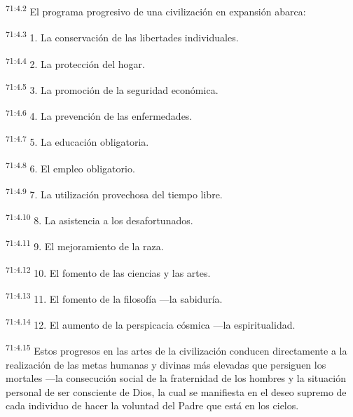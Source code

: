 \par
\textsuperscript{71:4.2} El programa progresivo de una civilización en expansión abarca:

\par
\textsuperscript{71:4.3} 1. La conservación de las libertades individuales.

\par
\textsuperscript{71:4.4} 2. La protección del hogar.

\par
\textsuperscript{71:4.5} 3. La promoción de la seguridad económica.

\par
\textsuperscript{71:4.6} 4. La prevención de las enfermedades.

\par
\textsuperscript{71:4.7} 5. La educación obligatoria.

\par
\textsuperscript{71:4.8} 6. El empleo obligatorio.

\par
\textsuperscript{71:4.9} 7. La utilización provechosa del tiempo libre.

\par
\textsuperscript{71:4.10} 8. La asistencia a los desafortunados.

\par
\textsuperscript{71:4.11} 9. El mejoramiento de la raza.

\par
\textsuperscript{71:4.12} 10. El fomento de las ciencias y las artes.

\par
\textsuperscript{71:4.13} 11. El fomento de la filosofía ---la sabiduría.

\par
\textsuperscript{71:4.14} 12. El aumento de la perspicacia cósmica ---la espiritualidad.

\par
\textsuperscript{71:4.15} Estos progresos en las artes de la civilización conducen directamente a la realización de las metas humanas y divinas más elevadas que persiguen los mortales ---la consecución social de la fraternidad de los hombres y la situación personal de ser consciente de Dios, la cual se manifiesta en el deseo supremo de cada individuo de hacer la voluntad del Padre que está en los cielos.

